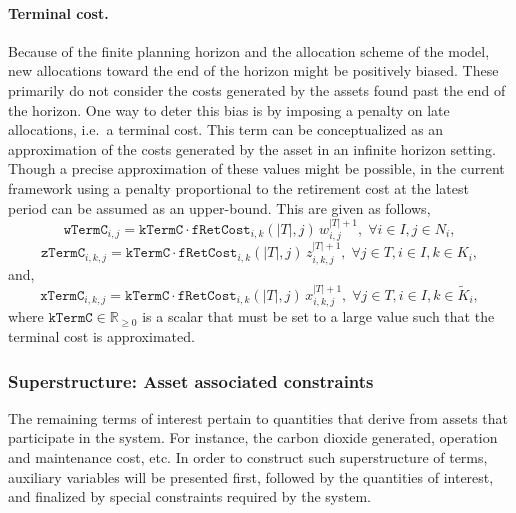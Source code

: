 \documentclass{amsart}
\begin{document}
\paragraph{Terminal cost.}
%
Because of the finite planning horizon and the allocation scheme of the model,
new allocations toward the end of the horizon might be positively biased. These
primarily do not consider the costs generated by the assets found past the end
of the horizon. 
%
One way to deter this bias is by imposing a penalty on late allocations, i.e.\ a
terminal cost. This term can be conceptualized as an approximation of the costs
generated by the asset in an infinite horizon setting. Though a precise
approximation of these values might be possible, in the current framework using
a penalty proportional to the retirement cost at the latest period can be
assumed as an upper-bound. This are given as follows,
%
\begin{equation}
    \mathtt{wTermC}_{i,j} = \mathtt{kTermC} \cdot
    \mathtt{fRetCost}_{i,k}\! \left(|T|,j\right)\, 
    w^{|T|+1}_{i,j}
    ,\; \forall i \in I, j \in N_i,
\end{equation}
%
\begin{equation}
    \mathtt{zTermC}_{i,k,j} = \mathtt{kTermC} \cdot
    \mathtt{fRetCost}_{i,k}\! \left(|T|,j\right)\, 
    z^{|T|+1}_{i,k,j},\; \forall
    j \in T, i \in I, k \in K_i,
\end{equation}
%
and,
%
\begin{equation}
    \mathtt{xTermC}_{i,k,j} = \mathtt{kTermC} \cdot
    \mathtt{fRetCost}_{i,k}\! \left(|T|,j\right)\, 
    x^{|T|+1}_{i,k,j},\; \forall
    j \in T, i \in I, k \in \tilde{K}_i,
\end{equation}
%
where $\mathtt{kTermC} \in \mathbb{R}_{\geq 0}$ is a scalar that must be set to
a large value such that the terminal cost is approximated.
%

\subsubsection{Superstructure: Asset associated constraints}
The remaining terms of interest pertain to quantities 
that derive from assets that participate in the system. 
For instance, the carbon dioxide generated, operation and
maintenance cost, etc. In order to construct such superstructure of terms,
auxiliary variables will be presented first, followed by the quantities of
interest, and finalized by special constraints required by the system. 
\end{document}

